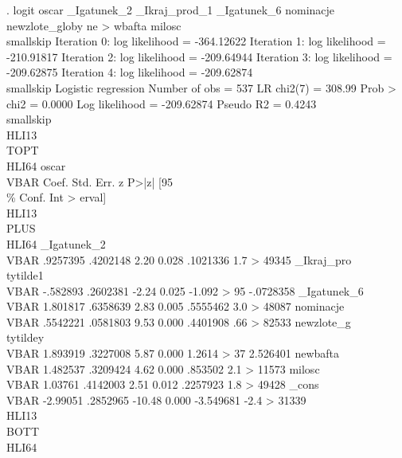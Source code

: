 . logit oscar _Igatunek_2 _Ikraj_prod_1 _Igatunek_6 nominacje newzlote_globy ne
> wbafta milosc
{\lbr}\\smallskip{\rbr}
Iteration 0:   log likelihood = -364.12622  
Iteration 1:   log likelihood = -210.91817  
Iteration 2:   log likelihood = -209.64944  
Iteration 3:   log likelihood = -209.62875  
Iteration 4:   log likelihood = -209.62874  
{\lbr}\\smallskip{\rbr}
Logistic regression                               Number of obs   =        537
                                                  LR chi2(7)      =     308.99
                                                  Prob > chi2     =     0.0000
Log likelihood = -209.62874                       Pseudo R2       =     0.4243
{\lbr}\\smallskip{\rbr}
\\HLI{\lbr}13{\rbr}{\lbr}\\TOPT{\rbr}\\HLI{\lbr}64{\rbr}
       oscar {\lbr}\\VBAR{\rbr}      Coef.   Std. Err.      z    P>|z|     [95\\\% Conf. Int
> erval]
\\HLI{\lbr}13{\rbr}{\lbr}\\PLUS{\rbr}\\HLI{\lbr}64{\rbr}
 _Igatunek_2 {\lbr}\\VBAR{\rbr}   .9257395   .4202148     2.20   0.028     .1021336    1.7
> 49345
_Ikraj_pro{\lbr}\\tytilde{\rbr}1 {\lbr}\\VBAR{\rbr}   -.582893   .2602381    -2.24   0.025     -1.092
> 95   -.0728358
 _Igatunek_6 {\lbr}\\VBAR{\rbr}   1.801817   .6358639     2.83   0.005     .5555462    3.0
> 48087
   nominacje {\lbr}\\VBAR{\rbr}   .5542221   .0581803     9.53   0.000     .4401908    .66
> 82533
newzlote_g{\lbr}\\tytilde{\rbr}y {\lbr}\\VBAR{\rbr}   1.893919   .3227008     5.87   0.000     1.2614
> 37    2.526401
    newbafta {\lbr}\\VBAR{\rbr}   1.482537   .3209424     4.62   0.000      .853502    2.1
> 11573
      milosc {\lbr}\\VBAR{\rbr}    1.03761   .4142003     2.51   0.012     .2257923    1.8
> 49428
       _cons {\lbr}\\VBAR{\rbr}   -2.99051   .2852965   -10.48   0.000    -3.549681   -2.4
> 31339
\\HLI{\lbr}13{\rbr}{\lbr}\\BOTT{\rbr}\\HLI{\lbr}64{\rbr}
